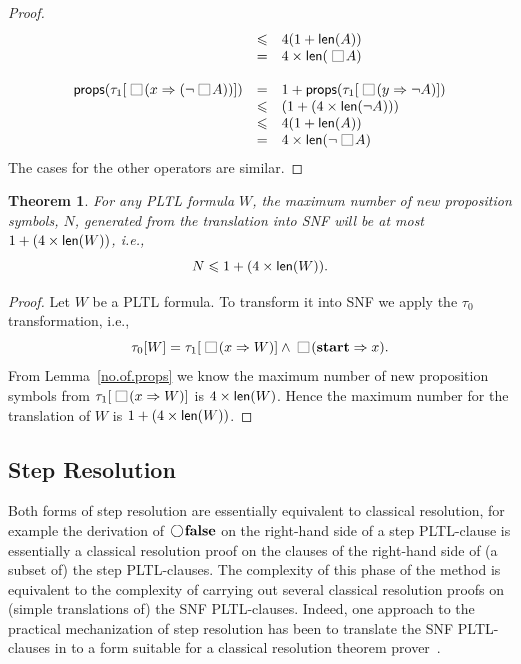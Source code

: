 \documentclass[nohyperref]{acmtrans2f}
\newcommand{\always}{\raisebox{-.2ex}{
                           \mbox{\unitlength=0.9ex
                           \begin{picture}(2,2)
                           \linethickness{0.06ex}
                           \put(0,0){\line(1,0){2}}
                           \put(0,2){\line(1,0){2}}
                           \put(0,0){\line(0,1){2}}
                           \put(2,0){\line(0,1){2}}
                           \end{picture}}}
                          \,}
\newcommand{\next}{\!\raisebox{-.2ex}{ %
                        \mbox{\unitlength=0.9ex
                        \begin{picture}(2,2)
                        \linethickness{0.06ex}
                        \put(1,1){\circle{2}} %
                        \end{picture}}}       %
                        \,}
\let\imp=\Rightarrow
\let\iff=\Leftrightarrow
\def\lfalse{\hbox{\rm\bf false}}
\def\lstart{\hbox{\rm\bf start}}
\newtheorem{subtheorem}{Theorem}[subsection]
\newcommand{\len}{{\sf len}}
\newcommand{\props}{{\sf props}}
\begin{document}
\begin{proof}
$$\begin{array}{rcl}
      & \leqslant &     4 (1 + \len(A) ) \\
      & = &      4 \times \len(\always A)\\
\\
\props(\tau_1[\always(x \imp (\neg \always A))]) & = & 1 +
     \props(\tau_1[\always(y \imp \neg A)])\\
     & \leqslant &     (1  + (4 \times \len(\neg A))) \\
      & \leqslant &     4 (1 + \len(A)) \\
      & = &      4 \times \len(\neg \always A)
\end{array}$$
%
The cases for the other operators are similar.
\end{proof}
\begin{subtheorem}
For any PLTL formula $W$,
the maximum number of new proposition symbols, $N$, generated from the translation
into SNF will be  at most $1 + (4 \times \len(W))$, i.e.,
$$
N \leqslant 1 + (4 \times \len(W)).
$$
\end{subtheorem}
\begin{proof}
Let $W$ be a PLTL formula. To transform it into SNF we apply the
$\tau_0$ transformation, i.e.,
$$
\tau_0[W] = \tau_1[\always(x \imp W)] \land \always(\lstart \imp x).
$$
 From Lemma~\ref{no.of.props} we know the maximum number of new
proposition symbols from $\tau_1[\always(x \imp W)]$ is $4 \times
\len(W)$. Hence the maximum number for the translation of $W$ is $1 +
(4 \times \len(W))$.
\end{proof}

\subsection{Step Resolution}
%
Both forms of step resolution are essentially equivalent to classical
resolution, for example the derivation of $\next \lfalse$ on the right-hand
side of a step PLTL-clause is essentially a classical resolution proof on the
clauses of the right-hand side of (a subset of) the step PLTL-clauses.
The complexity of this phase of the method is
equivalent to the complexity of carrying out several classical resolution
proofs on
(simple translations of) the SNF PLTL-clauses. Indeed, one approach to the
practical mechanization of step resolution has been to translate the
SNF PLTL-clauses in to a form suitable for a classical resolution theorem
prover~\cite{Dix97-ICTL}. 
\end{document}
